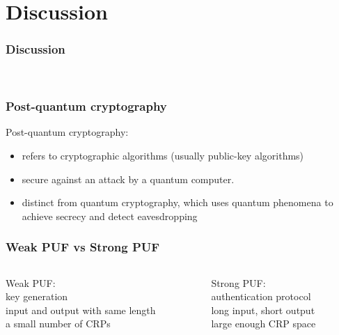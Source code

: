 \documentclass{beamer}
\begin{document}
\section{Discussion}
\begin{outlineframe}
	\tableofcontents[currentsection]
\end{outlineframe}
\begin{frame}
	\frametitle{Discussion}
	\\	
\end{frame}	

\begin{frame}
	\frametitle{Post-quantum cryptography}
	Post-quantum cryptography: \\
	\begin{itemize}
		\item refers to cryptographic algorithms (usually public-key algorithms)\\ 
	\end{itemize}
	\begin{itemize}
		\item secure against an attack by a quantum computer.\\
	\end{itemize}
	\begin{itemize}
	\item distinct from quantum cryptography, which uses quantum phenomena to achieve secrecy and detect eavesdropping\\ 
	\end{itemize}
\end{frame}	


\begin{frame}
	\frametitle{Weak PUF vs Strong PUF}
		\begin{columns}
			\begin{column}{.48\textwidth}
				\alert{Weak PUF:}\\
				\vspace{0.3cm}
				key generation\\
				input and output with same length\\ 
				a small number of CRPs\\
				\vspace{0.5cm}
			\end{column}
			\begin{column}{.48\textwidth}
				\alert{Strong PUF:}\\
				\vspace{0.3cm}
				authentication protocol\\
				long input, short output\\
				large enough CRP space\\
				\vspace{0.5cm}
			\end{column}
		\end{columns}
\end{frame}
\end{document}
